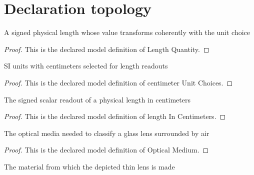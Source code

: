\section{Declaration topology}
\begin{definition}
  \label{def:physics:phyx-mini-0066:phyxminiproblems-problemphyxmini0066-lengthquantity}
  A signed physical length whose value transforms coherently with the unit choice
\end{definition}
\begin{proof}
  This is the declared model definition of Length Quantity.
\end{proof}
\begin{definition}
  \label{def:physics:phyx-mini-0066:phyxminiproblems-problemphyxmini0066-centimeterunitchoices}
  SI units with centimeters selected for length readouts
\end{definition}
\begin{proof}
  This is the declared model definition of centimeter Unit Choices.
\end{proof}
\begin{definition}
  \label{def:physics:phyx-mini-0066:phyxminiproblems-problemphyxmini0066-lengthincentimeters}
  The signed scalar readout of a physical length in centimeters
\end{definition}
\begin{proof}
  This is the declared model definition of length In Centimeters.
\end{proof}
\begin{definition}
  \label{def:physics:phyx-mini-0066:phyxminiproblems-problemphyxmini0066-opticalmedium}
  The optical media needed to classify a glass lens surrounded by air
\end{definition}
\begin{proof}
  This is the declared model definition of Optical Medium.
\end{proof}
\begin{definition}
  \label{def:physics:phyx-mini-0066:phyxminiproblems-problemphyxmini0066-lensmaterial}
  The material from which the depicted thin lens is made
\end{definition}
